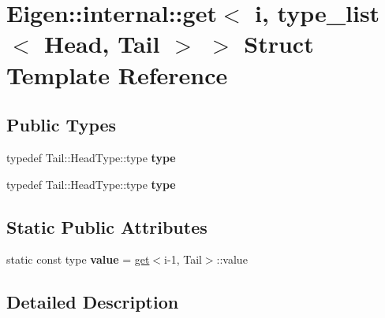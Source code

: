 \hypertarget{struct_eigen_1_1internal_1_1get_3_01i_00_01type__list_3_01_head_00_01_tail_01_4_01_4}{}\section{Eigen\+:\+:internal\+:\+:get$<$ i, type\+\_\+list$<$ Head, Tail $>$ $>$ Struct Template Reference}
\label{struct_eigen_1_1internal_1_1get_3_01i_00_01type__list_3_01_head_00_01_tail_01_4_01_4}
\subsection*{Public Types}
\begin{DoxyCompactItemize}
\item 
\mbox{\label{struct_eigen_1_1internal_1_1get_3_01i_00_01type__list_3_01_head_00_01_tail_01_4_01_4_a112e24122dd85479aa9f2661cc226764}} 
typedef Tail\+::\+Head\+Type\+::type {\bfseries type}
\item 
\mbox{\label{struct_eigen_1_1internal_1_1get_3_01i_00_01type__list_3_01_head_00_01_tail_01_4_01_4_a112e24122dd85479aa9f2661cc226764}} 
typedef Tail\+::\+Head\+Type\+::type {\bfseries type}
\end{DoxyCompactItemize}
\subsection*{Static Public Attributes}
\begin{DoxyCompactItemize}
\item 
\mbox{\label{struct_eigen_1_1internal_1_1get_3_01i_00_01type__list_3_01_head_00_01_tail_01_4_01_4_a0ccd884b66aa9ae1dade575ac5236059}} 
static const type {\bfseries value} = \hyperlink{struct_eigen_1_1internal_1_1get}{get}$<$i-\/1, Tail$>$\+::value
\end{DoxyCompactItemize}


\subsection{Detailed Description}
